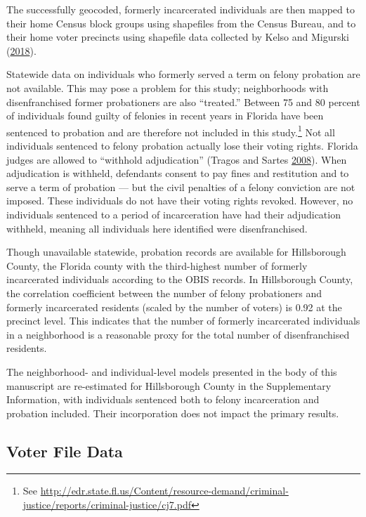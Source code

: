 \documentclass[
  12pt,
]{article}
\begin{document}
The successfully geocoded, formerly incarcerated individuals are then mapped to their home Census block groups using shapefiles from the Census Bureau, and to their home voter precincts using shapefile data collected by Kelso and Migurski (\protect\hyperlink{ref-Kelso2018}{2018}).

Statewide data on individuals who formerly served a term on felony probation are not available. This may pose a problem for this study; neighborhoods with disenfranchised former probationers are also ``treated.'' Between 75 and 80 percent of individuals found guilty of felonies in recent years in Florida have been sentenced to probation and are therefore not included in this study.\footnote{See \url{http://edr.state.fl.us/Content/resource-demand/criminal-justice/reports/criminal-justice/cj7.pdf}} Not all individuals sentenced to felony probation actually lose their voting rights. Florida judges are allowed to ``withhold adjudication'' (Tragos and Sartes \protect\hyperlink{ref-Tragos2008}{2008}). When adjudication is withheld, defendants consent to pay fines and restitution and to serve a term of probation --- but the civil penalties of a felony conviction are not imposed. These individuals do not have their voting rights revoked. However, no individuals sentenced to a period of incarceration have had their adjudication withheld, meaning all individuals here identified were disenfranchised.

Though unavailable statewide, probation records are available for Hillsborough County, the Florida county with the third-highest number of formerly incarcerated individuals according to the OBIS records. In Hillsborough County, the correlation coefficient between the number of felony probationers and formerly incarcerated residents (scaled by the number of voters) is 0.92 at the precinct level. This indicates that the number of formerly incarcerated individuals in a neighborhood is a reasonable proxy for the total number of disenfranchised residents.

The neighborhood- and individual-level models presented in the body of this manuscript are re-estimated for Hillsborough County in the Supplementary Information, with individuals sentenced both to felony incarceration and probation included. Their incorporation does not impact the primary results.

\hypertarget{voter-file-data}{%
\subsection*{Voter File Data}\label{voter-file-data}}
\end{document}
